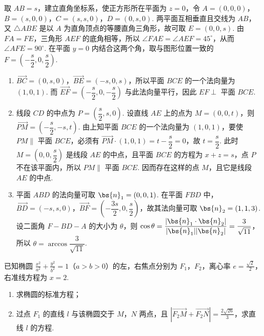 \begin{solution}
取 \(AB=s\)，建立直角坐标系，使正方形所在平面为 \(z=0\)，令 \(A=(0,0,0)\)，\(B=(s,0,0)\)，\(C=(s,s,0)\)，\(D=(0,s,0)\). 两平面互相垂直且交线为 \(AB\)，又 \(\triangle ABE\) 是以 \(A\) 为直角顶点的等腰直角三角形，故可取 \(E=(0,0,s)\). 由 \(FA=FE\)，三角形 \(AEF\) 的底角相等，所以 \(\angle FAE=\angle AEF=45^{\circ}\)，从而 \(\angle AFE=90^{\circ}\). 在平面 \(y=0\) 内结合这两个角，取与图形位置一致的 \(F=\left(-\dfrac{s}{2},0,\dfrac{s}{2}\right)\).

\begin{enumerate}
\item \(\overrightarrow{BC}=(0,s,0)\)，\(\overrightarrow{BE}=(-s,0,s)\)，所以平面 \(BCE\) 的一个法向量为 \((1,0,1)\). 而 \(\overrightarrow{EF}=\left(-\dfrac{s}{2},0,-\dfrac{s}{2}\right)\) 与此法向量平行，因此 \(EF\perp\) 平面 \(BCE\).
\item 线段 \(CD\) 的中点为 \(P=\left(\dfrac{s}{2},s,0\right)\). 设直线 \(AE\) 上的点为 \(M=(0,0,t)\)，则 \(\overrightarrow{PM}=\left(-\dfrac{s}{2},-s,t\right)\). 由上知平面 \(BCE\) 的一个法向量为 \((1,0,1)\)，要使 \(PM\parallel\) 平面 \(BCE\)，必须有 \(\overrightarrow{PM}\cdot(1,0,1)=t-\dfrac{s}{2}=0\)，故 \(t=\dfrac{s}{2}\). 此时 \(M=\left(0,0,\dfrac{s}{2}\right)\) 是线段 \(AE\) 的中点，且平面 \(BCE\) 的方程为 \(x+z=s\)，点 \(P\) 不在该平面内，所以 \(PM\parallel\) 平面 \(BCE\). 因而存在这样的点 \(M\)，且它是线段 \(AE\) 的中点.
\item 平面 \(ABD\) 的法向量可取 \(\bs{n}_1=(0,0,1)\). 在平面 \(FBD\) 中，\(\overrightarrow{BD}=(-s,s,0)\)，\(\overrightarrow{BF}=\left(-\dfrac{3s}{2},0,\dfrac{s}{2}\right)\)，故其法向量可取 \(\bs{n}_2=(1,1,3)\). 设二面角 \(F-BD-A\) 的大小为 \(\theta\)，则
\(\cos\theta=\dfrac{|\bs{n}_1\cdot\bs{n}_2|}{|\bs{n}_1||\bs{n}_2|}=\dfrac{3}{\sqrt{11}}\)，所以 \(\theta=\arccos\dfrac{3}{\sqrt{11}}\).
\end{enumerate}
\end{solution}

\begin{problem}
已知椭圆 \(\frac{x^2}{a^2} + \frac{y^2}{b^2} = 1\)（\(a > b > 0\)）的左，右焦点分别为 \(F_1\)，\(F_2\)，离心率 \(e = \frac{\sqrt{2}}{2}\)，右准线方程为 \(x = 2\).

\begin{enumerate}
\item 求椭圆的标准方程；
\item 过点 \(F_{1}\) 的直线 \(l\) 与该椭圆交于 \(M\)，\(N\) 两点，且 \(\left|\overrightarrow{F_2M} + \overrightarrow{F_2N}\right| = \frac{2\sqrt{26}}{3}\)，求直线 \(l\) 的方程.
\end{enumerate}
\end{problem}

